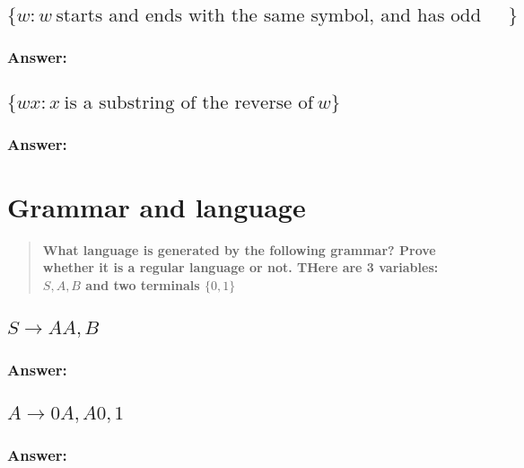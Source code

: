 \documentclass[titlepage]{article}\usepackage[]{graphicx}\usepackage[]{color}
\begin{document}
\subsection{\(\{w : w \ \mbox{starts and ends with the same symbol, and has odd length}\}\)}
\subsubsection*{Answer:}
\vspace{5cm}



\subsection{\(\{wx : x \ \mbox{is a substring of the reverse of} \ w\}\)}
\subsubsection*{Answer:}
\vspace{5cm}

\section{Grammar and language}
\begin{quote}
  \textbf{What language is generated by the following grammar?
    Prove whether it is a regular language or not. THere are 3 variables:
  \(S, A, B\) and two terminals \(\{0,1\}\) }
\end{quote}
\subsection{\(S \to AA,B\)}
\subsubsection*{Answer:}
\vspace{5cm}


\subsection{\(A \to 0A, A0, 1\)}
\subsubsection*{Answer:}
\vspace{5cm}
\end{document}

